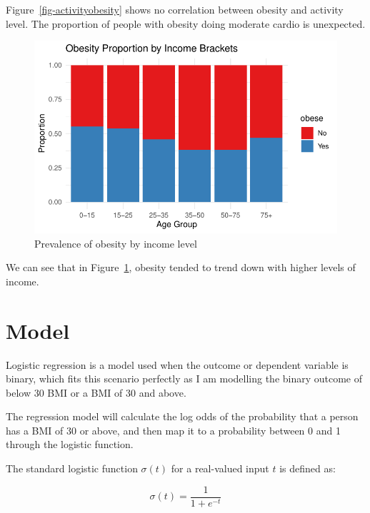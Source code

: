 \documentclass[
  letterpaper,
  DIV=11,
  numbers=noendperiod]{scrartcl}
\begin{document}
Figure~\ref{fig-activityobesity} shows no correlation between obesity
and activity level. The proportion of people with obesity doing moderate
cardio is unexpected.

\begin{figure}

{\centering \includegraphics[width=\textwidth,height=0.2\textheight]{paper_files/figure-pdf/fig-incomeobesity-1.pdf}

}

\caption{\label{fig-incomeobesity}Prevalence of obesity by income level}

\end{figure}

We can see that in Figure~\ref{fig-incomeobesity}, obesity tended to
trend down with higher levels of income. \newpage

\hypertarget{model}{%
\section{Model}\label{model}}

Logistic regression is a model used when the outcome or dependent
variable is binary, which fits this scenario perfectly as I am modelling
the binary outcome of below 30 BMI or a BMI of 30 and above.

The regression model will calculate the log odds of the probability that
a person has a BMI of 30 or above, and then map it to a probability
between 0 and 1 through the logistic function.

The standard logistic function \(\sigma(t)\) for a real-valued input
\(t\) is defined as:

\[ \sigma(t) = \frac{1}{1 + e^{-t}} \]
\end{document}
